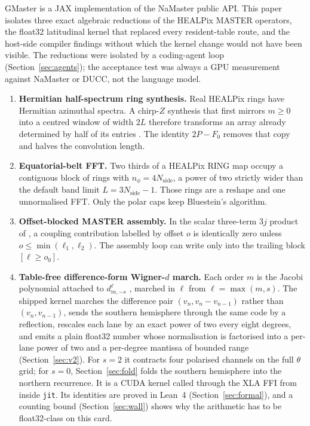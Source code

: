 \documentclass[usenatbib,useAMS]{mnras}
\begin{document}
GMaster is a JAX implementation of the NaMaster public API. This paper isolates three exact algebraic reductions of the HEALPix MASTER operators, the float32 latitudinal kernel that replaced every resident-table route, and the host-side compiler findings without which the kernel change would not have been visible. The reductions were isolated by a coding-agent loop (Section~\ref{sec:agents}); the acceptance test was always a GPU measurement against NaMaster or DUCC, not the language model.

\begin{enumerate}
\item \textbf{Hermitian half-spectrum ring synthesis.} Real HEALPix rings have Hermitian azimuthal spectra. A chirp-$Z$ synthesis that first mirrors $m\ge0$ into a centred window of width $2L$ therefore transforms an array already determined by half of its entries \citep{bluestein1970}. The identity $2P-F_0$ removes that copy and halves the convolution length.
\item \textbf{Equatorial-belt FFT.} Two thirds of a HEALPix RING map occupy a contiguous block of rings with $n_\phi=4N_{\mathrm{side}}$, a power of two strictly wider than the default band limit $L=3N_{\mathrm{side}}-1$. Those rings are a reshape and one unnormalised FFT. Only the polar caps keep Bluestein's algorithm.
\item \textbf{Offset-blocked MASTER assembly.} In the scalar three-term $3j$ product of \citet{kiddier2026}, a coupling contribution labelled by offset $o$ is identically zero unless $o\le\min(\ell_1,\ell_2)$. The assembly loop can write only into the trailing block $[\ell\ge o_0]$.
\item \textbf{Table-free difference-form Wigner-$d$ march.} Each order $m$ is the Jacobi polynomial attached to $d^\ell_{m,-s}$ \citep{olver2010}, marched in $\ell$ from $\ell=\max(m,s)$. The shipped kernel marches the difference pair $(v_n,v_n-v_{n-1})$ rather than $(v_n,v_{n-1})$, sends the southern hemisphere through the same code by a reflection, rescales each lane by an exact power of two every eight degrees, and emits a plain float32 number whose normalisation is factorised into a per-lane power of two and a per-degree mantissa of bounded range (Section~\ref{sec:v2}). For $s=2$ it contracts four polarised channels on the full $\theta$ grid; for $s=0$, Section~\ref{sec:fold} folds the southern hemisphere into the northern recurrence. It is a CUDA kernel called through the XLA FFI from inside \texttt{jit}. Its identities are proved in Lean~4 (Section~\ref{sec:formal}), and a counting bound (Section~\ref{sec:wall}) shows why the arithmetic has to be float32-class on this card.
\end{enumerate}
\end{document}
